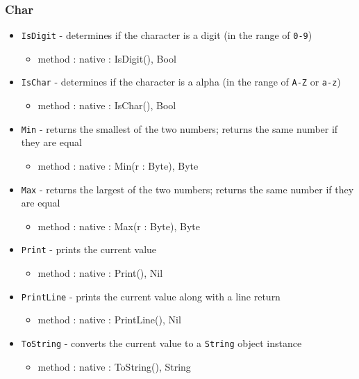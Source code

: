 \documentclass[12pt]{article}
\begin{document}
\subsubsection{Char}
\begin{itemize}
\item \texttt{IsDigit} - determines if the character is a digit (in the range of \texttt{0-9})
  \begin{itemize}
  \item method : native : IsDigit(), Bool
  \end{itemize}
\item \texttt{IsChar} - determines if the character is a alpha (in the range of \texttt{A-Z} or \texttt{a-z})
  \begin{itemize}
  \item method : native : IsChar(), Bool
  \end{itemize}
\item \texttt{Min} - returns the smallest of the two numbers; returns the same number if they are equal
  \begin{itemize}
  \item method : native : Min(r : Byte), Byte
  \end{itemize}
\item \texttt{Max} - returns the largest of the two numbers; returns the same number if they are equal
  \begin{itemize}
  \item method : native : Max(r : Byte), Byte
  \end{itemize}
\item \texttt{Print} - prints the current value
  \begin{itemize}
  \item method : native : Print(), Nil
  \end{itemize}
\item \texttt{PrintLine} - prints the current value along with a line return
  \begin{itemize}
  \item method : native : PrintLine(), Nil
  \end{itemize}
\item \texttt{ToString} - converts the current value to a \texttt{String} object instance
  \begin{itemize}
  \item method : native : ToString(), String
  \end{itemize}
\end{itemize}
\end{document}
